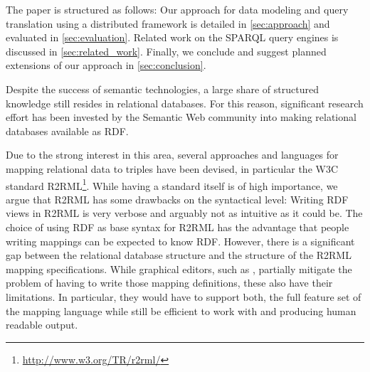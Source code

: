 The paper is structured as follows:
Our approach for data modeling and query translation using a distributed framework is detailed in \autoref{sec:approach} and evaluated in \autoref{sec:evaluation}.
Related work on the SPARQL query engines is discussed in \autoref{sec:related_work}.
Finally, we conclude and suggest planned extensions of our approach in \autoref{sec:conclusion}.



Despite the success of semantic technologies, a large share of structured knowledge still resides in relational databases.
For this reason, significant research effort has been invested by the Semantic Web community into making relational databases available as RDF.

Due to the strong interest in this area, several approaches and languages for mapping relational data to triples have been devised, in particular the W3C standard R2RML\footnote{\url{http://www.w3.org/TR/r2rml/}}.
While having a standard itself is of high importance, we argue that R2RML has some drawbacks on the syntactical level:
Writing RDF views in R2RML is very verbose and arguably not as intuitive as it could be.
The choice of using RDF as base syntax for R2RML has the advantage that people writing mappings can be expected to know RDF.
However, there is a significant gap between the relational database structure and the structure of the R2RML mapping specifications.
While graphical editors, such as \cite{sengupta2013editing}\cite{pinkel2014partner}, partially mitigate the problem of having to write those mapping definitions, these also have their limitations.
In particular, they would have to support both, the full feature set of the mapping language while still be efficient to work with and producing human readable output.
